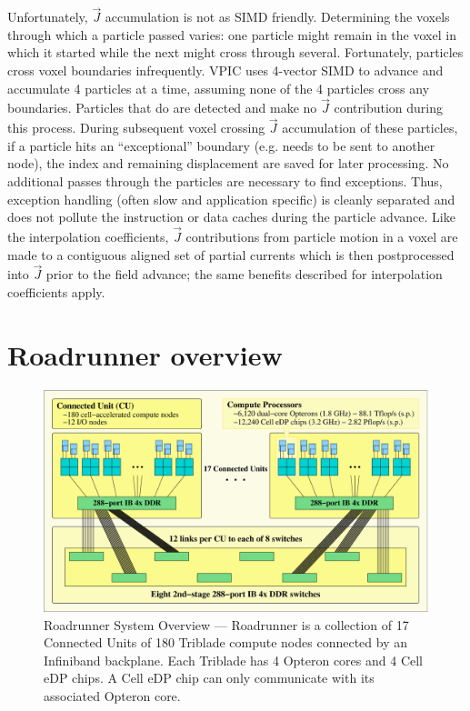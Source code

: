 \documentclass[journal,twoside]{IEEEtran}
\newcommand{\vecJ}{\vec{J}}
\begin{document}
Unfortunately, $\vecJ$ accumulation is not as SIMD friendly.
Determining the voxels through which a particle passed varies: one
particle might remain in the voxel in which it started while the next
might cross through several.  Fortunately, particles cross voxel
boundaries infrequently.  VPIC uses 4-vector SIMD to advance and
accumulate 4 particles at a time, assuming none of the 4 particles
cross any boundaries.  Particles that do are detected and make no
$\vecJ$ contribution during this process.  During subsequent voxel
crossing $\vecJ$ accumulation of these particles, if a particle hits
an ``exceptional'' boundary (e.g. needs to be sent to another node),
the index and remaining displacement are saved for later processing.
No additional passes through the particles are necessary to find
exceptions.  Thus, exception handling (often slow and application
specific) is cleanly separated and does not pollute the instruction or
data caches during the particle advance.  Like the interpolation
coefficients, $\vecJ$ contributions from particle motion in a voxel
are made to a contiguous aligned set of partial currents which is then
postprocessed into $\vecJ$ prior to the field advance; the same
benefits described for interpolation coefficients apply.

\section{Roadrunner overview}

\begin{figure}
\begin{center}
\includegraphics[width=7in]{figs/system.eps}
\caption{Roadrunner System Overview --- Roadrunner is a collection
of 17 Connected Units of 180 Triblade compute nodes connected by an
Infiniband backplane.  Each Triblade has 4 Opteron cores and 4 Cell
eDP chips.  A Cell eDP chip can only communicate with its associated
Opteron core.}
\label{fig:system}
\end{center}
\end{figure}
\end{document}
